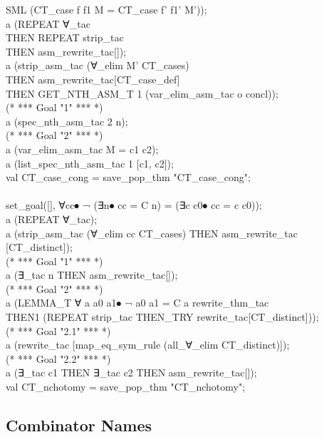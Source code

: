 {\begin{GFT}{SML}
\+         (CT\_case f f1 M = CT\_case f' f1' M')\PrKO{});\\
\+a (REPEAT ∀\_tac\\
\+	THEN REPEAT strip\_tac\\
\+	THEN asm\_rewrite\_tac[]);\\
\+a (strip\_asm\_tac (∀\_elim \PrKM{}M'\PrKO{} CT\_cases)\\
\+	THEN asm\_rewrite\_tac[CT\_case\_def]\\
\+	THEN GET\_NTH\_ASM\_T 1 (var\_elim\_asm\_tac o concl));\\
\+(* *** Goal "1" *** *)\\
\+a (spec\_nth\_asm\_tac 2 \PrKM{}n\PrKO{});\\
\+(* *** Goal "2" *** *)\\
\+a (var\_elim\_asm\_tac \PrKM{}M = c1  c2\PrKO{});\\
\+a (list\_spec\_nth\_asm\_tac 1 [\PrKM{}c1\PrKO{}, \PrKM{}c2\PrKO{}]);\\
\+val CT\_case\_cong = save\_pop\_thm "CT\_case\_cong";\\
\+\\
\+set\_goal([], \PrKM{}∀cc⦁ ¬ (∃n⦁ cc = C n) = (∃c c0⦁ cc = c  c0)\PrKO{});\\
\+a (REPEAT ∀\_tac);\\
\+a (strip\_asm\_tac (∀\_elim \PrKM{}cc\PrKO{} CT\_cases) THEN asm\_rewrite\_tac [CT\_distinct]);\\
\+(* *** Goal "1" *** *)\\
\+a (∃\_tac \PrKM{}n\PrKO{} THEN asm\_rewrite\_tac[]);\\
\+(* *** Goal "2" *** *)\\
\+a (LEMMA\_T \PrKM{}∀ a a0 a1⦁ ¬ a0  a1 = C a\PrKO{} rewrite\_thm\_tac\\
\+	THEN1 (REPEAT strip\_tac THEN\_TRY rewrite\_tac[CT\_distinct]));\\
\+(* *** Goal "2.1" *** *)\\
\+a (rewrite\_tac [map\_eq\_sym\_rule (all\_∀\_elim CT\_distinct)]);\\
\+(* *** Goal "2.2" *** *)\\
\+a (∃\_tac \PrKM{}c1\PrKO{} THEN ∃\_tac \PrKM{}c2\PrKO{} THEN asm\_rewrite\_tac[]);\\
\+val CT\_nchotomy = save\_pop\_thm "CT\_nchotomy";\\
\end{GFT}
}%

\subsection{Combinator Names}

